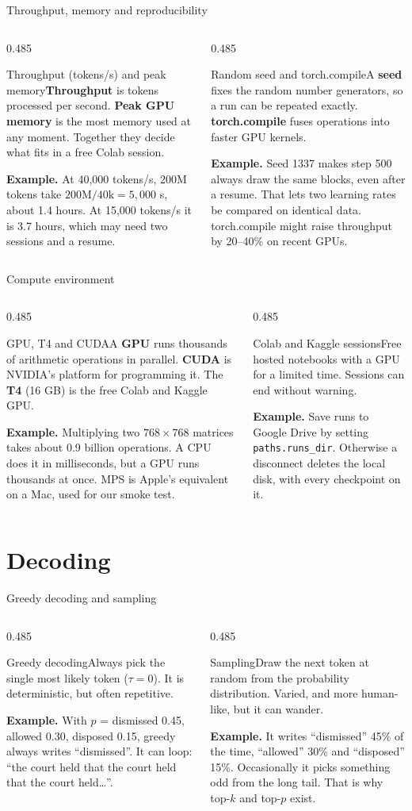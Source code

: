\documentclass[aspectratio=169,11pt]{beamer}
\newcommand{\code}[1]{\texttt{\small #1}}
\newcommand{\term}[3]{%
  \begin{block}{#1}\small #2\par\vspace{1mm}%
  {\color{exgreen}\textbf{Example.}} #3\end{block}}
\newcommand{\twoterms}[6]{%
  \begin{columns}[T]
    \begin{column}{0.485\textwidth}\term{#1}{#2}{#3}\end{column}
    \begin{column}{0.485\textwidth}\term{#4}{#5}{#6}\end{column}
  \end{columns}}
\begin{document}
\begin{frame}{Throughput, memory and reproducibility}
  \twoterms{Throughput (tokens/s) and peak memory}
  {\textbf{Throughput} is tokens processed per second. \textbf{Peak GPU memory} is the most memory used at any moment. Together they decide what fits in a free Colab session.}
  {At 40,000 tokens/s, 200M tokens take $200\text{M}/40\text{k}=5{,}000$ s, about 1.4 hours. At 15,000 tokens/s it is 3.7 hours, which may need two sessions and a resume.}
  {Random seed and torch.compile}
  {A \textbf{seed} fixes the random number generators, so a run can be repeated exactly. \textbf{torch.compile} fuses operations into faster GPU kernels.}
  {Seed 1337 makes step 500 always draw the same blocks, even after a resume. That lets two learning rates be compared on identical data. torch.compile might raise throughput by 20--40\% on recent GPUs.}
\end{frame}

\begin{frame}{Compute environment}
  \twoterms{GPU, T4 and CUDA}
  {A \textbf{GPU} runs thousands of arithmetic operations in parallel. \textbf{CUDA} is NVIDIA's platform for programming it. The \textbf{T4} (16 GB) is the free Colab and Kaggle GPU.}
  {Multiplying two $768\times768$ matrices takes about 0.9 billion operations. A CPU does it in milliseconds, but a GPU runs thousands at once. MPS is Apple's equivalent on a Mac, used for our smoke test.}
  {Colab and Kaggle sessions}
  {Free hosted notebooks with a GPU for a limited time. Sessions can end without warning.}
  {Save runs to Google Drive by setting \code{paths.runs\_dir}. Otherwise a disconnect deletes the local disk, with every checkpoint on it.}
\end{frame}

\section{Decoding}

\begin{frame}{Greedy decoding and sampling}
  \twoterms{Greedy decoding}
  {Always pick the single most likely token ($\tau=0$). It is deterministic, but often repetitive.}
  {With $p$ = dismissed 0.45, allowed 0.30, disposed 0.15, greedy always writes ``dismissed''. It can loop: ``the court held that the court held that the court held\ldots''.}
  {Sampling}
  {Draw the next token at random from the probability distribution. Varied, and more human-like, but it can wander.}
  {It writes ``dismissed'' 45\% of the time, ``allowed'' 30\% and ``disposed'' 15\%. Occasionally it picks something odd from the long tail. That is why top-$k$ and top-$p$ exist.}
\end{frame}
\end{document}
